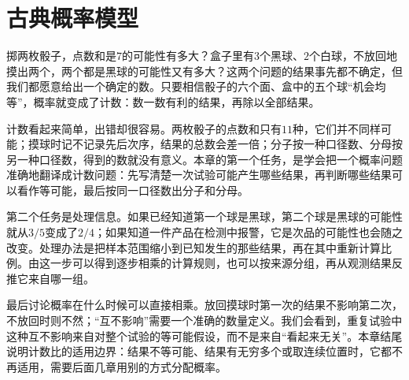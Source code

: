 \chapter{古典概率模型}
\label{chap:classical-probability}

掷两枚骰子，点数和是$7$的可能性有多大？盒子里有$3$个黑球、$2$个白球，不放回地摸出两个，两个都是黑球的可能性又有多大？这两个问题的结果事先都不确定，但我们都愿意给出一个确定的数。只要相信骰子的六个面、盒中的五个球“机会均等”，概率就变成了计数：数一数有利的结果，再除以全部结果。

计数看起来简单，出错却很容易。两枚骰子的点数和只有$11$种，它们并不同样可能；摸球时记不记录先后次序，结果的总数会差一倍；分子按一种口径数、分母按另一种口径数，得到的数就没有意义。本章的第一个任务，是学会把一个概率问题准确地翻译成计数问题：先写清楚一次试验可能产生哪些结果，再判断哪些结果可以看作等可能，最后按同一口径数出分子和分母。

第二个任务是处理信息。如果已经知道第一个球是黑球，第二个球是黑球的可能性就从$3/5$变成了$2/4$；如果知道一件产品在检测中报警，它是次品的可能性也会随之改变。处理办法是把样本范围缩小到已知发生的那些结果，再在其中重新计算比例。由这一步可以得到逐步相乘的计算规则，也可以按来源分组，再从观测结果反推它来自哪一组。

最后讨论概率在什么时候可以直接相乘。放回摸球时第一次的结果不影响第二次，不放回时则不然；“互不影响”需要一个准确的数量定义。我们会看到，重复试验中这种互不影响来自对整个试验的等可能假设，而不是来自“看起来无关”。本章结尾说明计数比的适用边界：结果不等可能、结果有无穷多个或取连续位置时，它都不再适用，需要后面几章用别的方式分配概率。








